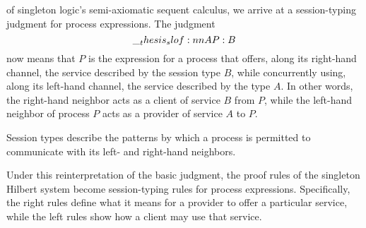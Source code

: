  of singleton logic's semi-axiomatic sequent calculus, we arrive at a session-typing judgment for process expressions.
The judgment
\begin{equation*}
  \slof{A |- P : B} %
\end{equation*}
now means that $P$ is the expression for a process that
offers, along its right-hand channel, the service described by the session type $B$, while concurrently using, along its left-hand channel, the service described by the type $A$.
In other words, the right-hand neighbor acts as a client of service $B$ from $P$, while the left-hand neighbor of process $P$ acts as a provider of service $A$ to $P$.

Session types describe the patterns by which a process is permitted to communicate with its left- and right-hand neighbors.

Under this reinterpretation of the basic judgment, the proof rules of the singleton Hilbert system become session-typing rules for process expressions.
Specifically, the right rules define what it means for a provider to offer a particular service, while the left rules show how a client may use that service.


